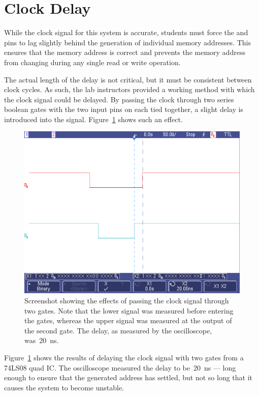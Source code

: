 \section{Clock Delay}

While the clock signal for this system is accurate, students must force the
 and  pins to lag slightly behind the generation of individual
memory addresses.  This ensures that the memory address is correct and prevents
the memory address from changing during any single read or write operation.

The actual length of the delay is not critical, but it must be consistent
between clock cycles.  As such, the lab instructors provided a working method
with which the clock signal could be delayed.  By passing the clock through two
series boolean  gates with the two input pins on each tied together, a
slight delay is introduced into the signal.  Figure~\ref{f:clock} shows such an
effect.
%
\begin{figure}[H]
\centering
	\includegraphics[width=.8\textwidth]{img/shot/and_delay.png}
	\parbox{.8\textwidth}{
	\caption[AND Gate Clock Delay]{Screenshot showing the effects of passing
	the clock signal through two  gates.  Note that the lower signal
	was measured before entering the  gates, whereas the upper signal
	was measured at the output of the second gate.  The delay, as measured by
	the oscilloscope, was~\SI{20}{\nano\second}.}
	\label{f:clock}}
\end{figure}
%
Figure~\ref{f:clock} shows the results of delaying the clock signal with two
 gates from a 74LS08 quad  IC.  The oscilloscope measured the
delay to be~\SI{20}{\nano\second} --- long enough to ensure that the generated
address has settled, but not so long that it causes the system to become
unstable.
